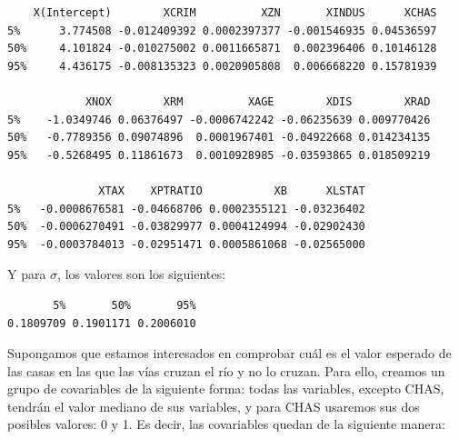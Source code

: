 \documentclass[12pt,a4paper,twoside,openright,titlepage,final]{article}
\begin{document}
\begin{verbatim}
    X(Intercept)        XCRIM          XZN       XINDUS      XCHAS
5%      3.774508 -0.012409392 0.0002397377 -0.001546935 0.04536597
50%     4.101824 -0.010275002 0.0011665871  0.002396406 0.10146128
95%     4.436175 -0.008135323 0.0020905808  0.006668220 0.15781939

            XNOX        XRM          XAGE        XDIS        XRAD    
5%    -1.0349746 0.06376497 -0.0006742242 -0.06235639 0.009770426 
50%   -0.7789356 0.09074896  0.0001967401 -0.04922668 0.014234135
95%   -0.5268495 0.11861673  0.0010928985 -0.03593865 0.018509219

              XTAX    XPTRATIO           XB      XLSTAT
5%   -0.0008676581 -0.04668706 0.0002355121 -0.03236402
50%  -0.0006270491 -0.03829977 0.0004124994 -0.02902430
95%  -0.0003784013 -0.02951471 0.0005861068 -0.02565000
\end{verbatim}

Y para $\sigma$, los valores son los siguientes:

\begin{verbatim}
       5%       50%       95% 
0.1809709 0.1901171 0.2006010 
\end{verbatim}

Supongamos que estamos interesados en comprobar cuál es el valor esperado de las casas en las que las vías cruzan el río y no lo cruzan. Para ello, creamos un grupo de covariables de la siguiente forma: todas las variables, excepto CHAS, tendrán el valor mediano de sus variables, y para CHAS usaremos sus dos posibles valores: 0 y 1. Es decir, las covariables quedan de la siguiente manera:

\begin{table}[htbp!]
\centering
{}
\end{table}
\end{document}
